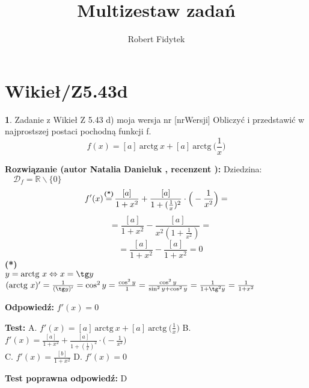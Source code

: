\documentclass[12pt, a4paper]{article}
\title{Multizestaw zadań}
\author{Robert Fidytek}
\date{}
\theoremstyle{definition} %
\newtheorem{zad}{}
\newcommand{\kategoria}[1]{\section{#1}} %
\newcommand{\zadStart}[1]{\begin{zad}#1\newline} %
\newcommand{\zadStop}{\end{zad}}   %
\newcommand{\rozwStart}[2]{\noindent \textbf{Rozwiązanie (autor #1 , recenzent #2): }\newline} %
\newcommand{\rozwStop}{\newline}                                            %
\newcommand{\odpStart}{\noindent \textbf{Odpowiedź:}\newline}    %
\newcommand{\odpStop}{\newline}                                             %
\newcommand{\testStart}{\noindent \textbf{Test:}\newline} %
\newcommand{\testStop}{\newline} %
\newcommand{\kluczStart}{\noindent \textbf{Test poprawna odpowiedź:}\newline} %
\newcommand{\kluczStop}{\newline} %
\begin{document}
\maketitle

\kategoria{Wikieł/Z5.43d}

\zadStart{Zadanie z Wikieł Z 5.43 d) moja wersja nr [nrWersji]}
Obliczyć i przedstawić w najprostszej postaci pochodną funkcji f.
$$f(x) = [a]\ \text{arctg}\ x + [a]\ \text{arctg}\ \Big(\frac{1}{x}\Big)$$
\zadStop

\rozwStart{Natalia Danieluk}{}
Dziedzina: $\quad \mathcal{D}_f=\mathbb{R}\backslash\{0\}$
$$f'(x) \mathrel{\stackrel{\makebox[0pt]{\mbox{\normalfont\scriptsize\textbf{(*)}}}}{=}}
\frac{[a]}{1+x^2} + \frac{[a]}{1+(\frac{1}{x})^2} \cdot \Big(-\frac{1}{x^2}\Big) =$$
$$\quad = \frac{[a]}{1+x^2} - \frac{[a]}{x^2(1+\frac{1}{x^2})} =$$
$$\quad = \frac{[a]}{1+x^2} - \frac{[a]}{1+x^2} = 0$$
{\normalfont\scriptsize\textbf{(*)}\\
$y = \text{arctg}\ x \Leftrightarrow x = \tg y$\\
$(\text{arctg}\ x)' = \frac{1}{(\tg y)'} = \cos^2y = \frac{\cos^2y}{1} = \frac{\cos^2y}{\sin^2y + \cos^2y} = \frac{1}{1 + \tg^2y}= \frac{1}{1 + x^2}$}
\rozwStop

\odpStart
$f'(x) = 0$
\odpStop

\testStart
A. $f'(x) = [a]\ \text{arctg}\ x + [a]\ \text{arctg}\ \Big(\frac{1}{x}\Big)$
B. $f'(x) = \frac{[a]}{1+x^2} + \frac{[a]}{1+(\frac{1}{x})^2} \cdot \Big(-\frac{1}{x^2}\Big)$\\
C. $f'(x) = \frac{[b]}{1+x^2}$
D. $f'(x) = 0$
\testStop

\kluczStart
D
\kluczStop
\end{document}
